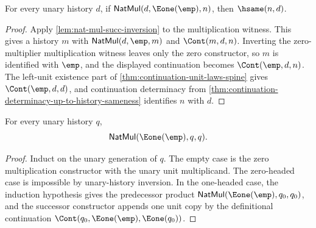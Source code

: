 \begin{lemma}
\label{lem:nat-mul-unit-right-hsame}
For every unary history $d$, if $\mathsf{NatMul}(d,\Eone(\emp),n)$, then $\hsame(n,d)$.
\end{lemma}
\begin{proof}
Apply \autoref{lem:nat-mul-succ-inversion} to the multiplication witness. This gives a history $m$ with $\mathsf{NatMul}(d,\emp,m)$ and $\Cont(m,d,n)$. Inverting the zero-multiplier multiplication witness leaves only the zero constructor, so $m$ is identified with $\emp$, and the displayed continuation becomes $\Cont(\emp,d,n)$. The left-unit existence part of \autoref{thm:continuation-unit-laws-spine} gives $\Cont(\emp,d,d)$, and continuation determinacy from \autoref{thm:continuation-determinacy-up-to-history-sameness} identifies $n$ with $d$.
\end{proof}

\begin{lemma}
\label{lem:nat-mul-unit-left-closed}
For every unary history $q$,
$$
\mathsf{NatMul}(\Eone(\emp),q,q).
$$
\end{lemma}
\begin{proof}
Induct on the unary generation of $q$. The empty case is the zero
multiplication constructor with the unary unit multiplicand. The zero-headed
case is impossible by unary-history inversion. In the one-headed case, the
induction hypothesis gives the predecessor product
$\mathsf{NatMul}(\Eone(\emp),q_0,q_0)$, and the successor constructor appends
one unit copy by the definitional continuation
$\Cont(q_0,\Eone(\emp),\Eone(q_0))$.
\end{proof}

